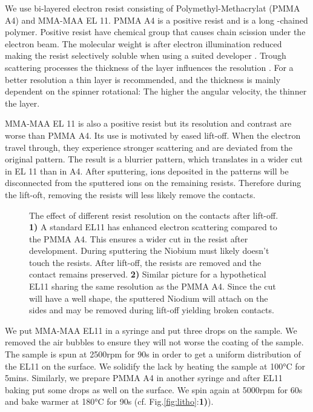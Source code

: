 \documentclass[../main.tex]{subfiles}
\begin{document}
    We use bi-layered electron resist consisting of Polymethyl-Methacrylat (PMMA A4) and MMA-MAA EL 11. PMMA A4 is a positive resist and is a long 
    -chained polymer. Positive resist have chemical group that causes chain scission under the electron beam. The molecular weight is after electron illumination reduced making the resist selectively soluble
    when using a suited developer \cite{tolliver1988handbook}.  Trough scattering processes the thickness of the layer influences the resolution \cite{tolliver1988handbook}. For a better resolution a thin layer is 
    recommended, and the thickness is mainly dependent on the spinner rotational: The higher the angular velocity, the thinner the layer\cite{bajuri2005pmma}. 

    MMA-MAA EL 11 is also a positive resist but its resolution and contrast are worse than PMMA A4. Its use is motivated by eased lift-off. When the electron travel through, they
    experience stronger scattering and are deviated from the original pattern. The result is a blurrier pattern, which translates in a wider cut in EL 11 than in A4. After sputtering, ions deposited 
    in the patterns will be disconnected from the sputtered ions on the remaining resists. Therefore during the lift-oft, removing the resists will less likely remove the contacts.
    
      \begin{figure}[H]
        \centering
      
      \caption{The effect of different resist resolution on the contacts after lift-off. \textbf{1)} A standard EL11 has enhanced electron scattering compared to the PMMA A4. This ensures 
      a wider cut in the resist after development. During sputtering the Niobium must likely doesn't touch the resists. After lift-off, the resists are removed and the contact remains preserved.
      \textbf{2)} Similar picture for a hypothetical EL11 sharing the same resolution as the PMMA A4. Since the cut will have a well shape, the sputtered Niodium will attach on the sides and 
      may be removed during lift-off yielding broken contacts.}
      \end{figure}

    We put MMA-MAA EL11 in a syringe and put three drops on the sample. We removed the air bubbles to ensure they will not worse the coating of the sample. The sample is spun at 2500rpm for 90s in order
    to get a uniform distribution of the EL11 on the surface. We solidify the lack by heating the sample at 100\si{\celsius} for 5mins. Similarly, we prepare PMMA A4 in another syringe
    and after EL11 baking put some drops as well on the surface. We spin again at 5000rpm for 60s and bake warmer at 180\si{\celsius} for 90s  (cf. Fig.\ref{fig:litho}:\textbf{1)}).
\end{document}
